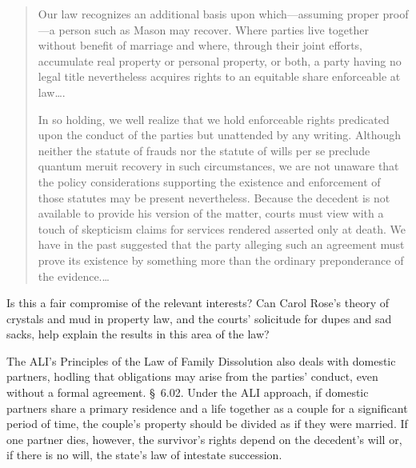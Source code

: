 \begin{quotation}
Our law recognizes an additional basis upon which---assuming proper proof---a
person such as Mason may recover. Where parties live together without
benefit of marriage and where, through their joint efforts, accumulate real
property or personal property, or both, a party having no legal title
nevertheless acquires rights to an equitable share enforceable at law\dots.

In so holding, we well realize that we hold enforceable rights predicated upon
the conduct of the parties but unattended by any writing. Although neither the
statute of frauds nor the statute of wills per se preclude quantum meruit
recovery in such circumstances, we are not unaware that the policy
considerations supporting the existence and enforcement of those statutes may
be present nevertheless. Because the decedent is not available to provide his
version of the matter, courts must view with a touch of skepticism claims for
services rendered asserted only at death. We have in the past suggested that
the party alleging such an agreement must prove its existence by something more
than the ordinary preponderance of the evidence.\dots
\end{quotation}

Is this a fair compromise of the relevant interests? Can Carol Rose's theory of
crystals and mud in property law, and the courts' solicitude for dupes and sad
sacks, help explain the results in this area of the law?

\item
The ALI's Principles of the Law of Family Dissolution also deals with domestic
partners, hodling that obligations may arise from the parties' conduct, even
without a formal agreement. \S~6.02. Under the ALI approach, if domestic
partners share a primary residence and a life together as a couple for a
significant period of time, the couple's property should be divided as if they
were married. If one partner dies, however, the survivor's rights depend on the
decedent's will or, if there is no will, the state's law of intestate
succession.

